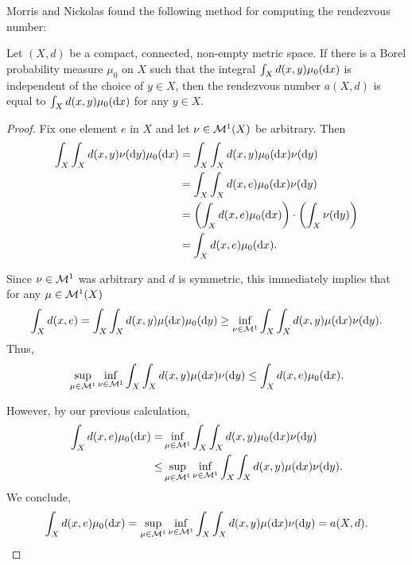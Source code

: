 Morris and Nickolas \cite{Morris1983} found the following method for computing the rendezvous number:

\begin{theorem}
	Let $(X,d)$ be a compact, connected, non-empty metric space. If there is a Borel probability measure $\mu_0$ on $X$ such that the integral $\int_X d(x,y)\mu_0(\mathrm{d}x)$ is independent of the choice of $y\in X$, then the rendezvous number $a(X,d)$ is equal to $\int_X d(x,y)\mu_0(\mathrm{d}x)$ for any  $y\in X$.
\end{theorem}

\begin{proof}
	Fix one element $e$ in $X$ and let $\nu\in \mathcal{M}^1(X)$ be arbitrary. Then
	\begin{align*}
		\int_X\int_X d(x,y)\nu(\mathrm{d}y)\mu_0(\mathrm{d}x)&=\int_X\int_X d(x,y)\mu_0(\mathrm{d}x)\nu(\mathrm{d}y)
		\\
		&=\int_X\int_X d(x,e)\mu_0(\mathrm{d}x)\nu(\mathrm{d}y)
		\\
		&=\left(\int_X d(x,e)\mu_0(\mathrm{d}x)\right)\cdot\left(\int_X\nu(\mathrm{d}y)\right)
		\\
		&=\int_Xd(x,e)\mu_0(\mathrm{d}x).
	\end{align*}
	
	Since $\nu\in \mathcal{M}^1$ was arbitrary and $d$ is symmetric, this immediately implies that for any $\mu\in \mathcal{M}^1(X)$
	\[
	\int_X d(x,e)=\int_X\int_X d(x,y)\mu(\mathrm{d}x)\mu_0(\mathrm{d}y)\geq\inf\limits_{\nu\in \mathcal{M}^1}\int_X\int_X d(x,y)\mu(\mathrm{d}x)\nu(\mathrm{d}y).
	\]
	Thus,
	\[
	\sup_{\mu\in\mathcal{M}^1}\inf_{\nu\in\mathcal{M}^1}\int_X\int_X d(x,y)\mu(\mathrm{d}x)\nu(\mathrm{d}y)\leq\int_Xd(x,e)\mu_0(\mathrm{d}x).
	\]
	
	However, by our previous calculation,
	\begin{align*}
	\int_X d(x,e)\mu_0(\mathrm{d}x)=&\inf_{\mu\in\mathcal{M}^1}\int_X\int_X d(x,y)\mu_0(\mathrm{d}x)\nu(\mathrm{d}y)
	\\
	\leq&\sup_{\mu\in\mathcal{M}^1}\inf_{\nu\in\mathcal{M}^1}\int_X\int_X d(x,y)\mu(\mathrm{d}x)\nu(\mathrm{d}y).
	\end{align*}
	We conclude,
	\[
	\int_Xd(x,e)\mu_0(\mathrm{d}x)=\sup_{\mu\in\mathcal{M}^1}\inf_{\nu\in\mathcal{M}^1}\int_X\int_X d(x,y)\mu(\mathrm{d}x)\nu(\mathrm{d}y)=a(X,d).\qedhere
	\]
\end{proof}

